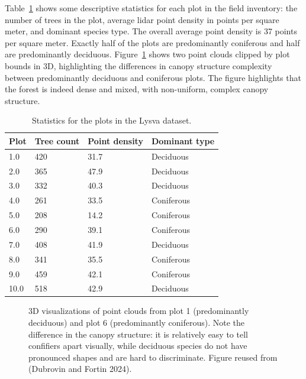 Table~\ref{tbl-lysva-plot-stats} shows some descriptive statistics for each plot in the field inventory: the number of trees in the plot, average \gls{lidar} point density in points per square meter, and dominant species type.
The overall average point density is 37 points per square meter.
Exactly half of the plots are predominantly coniferous and half are predominantly deciduous.
Figure~\ref{fig-lysva-canopy-structure} shows two point clouds clipped by plot bounds in 3D, highlighting the differences in canopy structure complexity between predominantly deciduous and coniferous plots.
The figure highlights that the forest is indeed dense and mixed, with non-uniform, complex canopy structure.

\begin{table}
    \centering
    \caption{\label{tbl-lysva-plot-stats}Statistics for the plots in the
Lysva dataset.}
    \begin{tabular}{llll}
    \toprule
Plot & Tree count & Point density & Dominant type \\
    \midrule
1.0 & 420 & 31.7 & Deciduous \\
2.0 & 365 & 47.9 & Deciduous \\
3.0 & 332 & 40.3 & Deciduous \\
4.0 & 261 & 33.5 & Coniferous \\
5.0 & 208 & 14.2 & Coniferous \\
6.0 & 290 & 39.1 & Coniferous \\
7.0 & 408 & 41.9 & Deciduous \\
8.0 & 341 & 35.5 & Coniferous \\
9.0 & 459 & 42.1 & Coniferous \\
10.0 & 518 & 42.9 & Deciduous \\
    \bottomrule
    \end{tabular}
\end{table}

\begin{figure}
\caption[Comparison of canopy structure in 3D point clouds.]{\label{fig-lysva-canopy-structure}3D visualizations of point
clouds from plot 1 (predominantly deciduous) and plot 6 (predominantly
coniferous). Note the difference in the canopy structure: it is
relatively easy to tell confifiers apart visually, while deciduous
species do not have pronounced shapes and are hard to discriminate.
Figure reused from (Dubrovin and Fortin 2024).}
\end{figure}

